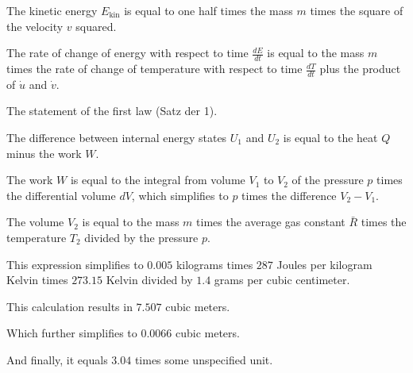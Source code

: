 The kinetic energy \( E_{\text{kin}} \) is equal to one half times the mass \( m \) times the square of the velocity \( v \) squared.

The rate of change of energy with respect to time \( \frac{dE}{dt} \) is equal to the mass \( m \) times the rate of change of temperature with respect to time \( \frac{dT}{dt} \) plus the product of \( \dot{u} \) and \( \dot{v} \).

The statement of the first law (Satz der 1).

The difference between internal energy states \( U_1 \) and \( U_2 \) is equal to the heat \( Q \) minus the work \( W \).

The work \( W \) is equal to the integral from volume \( V_1 \) to \( V_2 \) of the pressure \( p \) times the differential volume \( dV \), which simplifies to \( p \) times the difference \( V_2 - V_1 \).

The volume \( V_2 \) is equal to the mass \( m \) times the average gas constant \( \bar{R} \) times the temperature \( T_2 \) divided by the pressure \( p \).

This expression simplifies to \( 0.005 \) kilograms times \( 287 \) Joules per kilogram Kelvin times \( 273.15 \) Kelvin divided by \( 1.4 \) grams per cubic centimeter.

This calculation results in \( 7.507 \) cubic meters.

Which further simplifies to \( 0.0066 \) cubic meters.

And finally, it equals \( 3.04 \) times some unspecified unit.